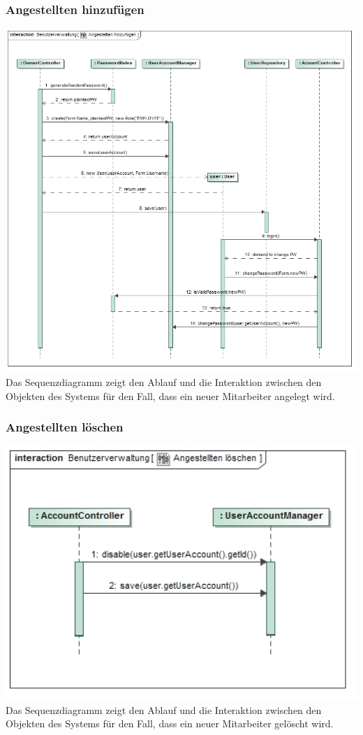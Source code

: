 \documentclass[pdftex,12pt,a4paper]{article}
\begin{document}
\subsubsection*{Angestellten hinzuf\"ugen}
\includegraphics[width=1\textwidth]{../../Entwurf/angestellten_hinzufuegen_ood}
Das Sequenzdiagramm zeigt den Ablauf und die Interaktion zwischen den Objekten des Systems f\"ur den Fall, dass ein neuer Mitarbeiter angelegt wird.
\subsubsection*{Angestellten l\"oschen}
\includegraphics[width=1\textwidth]{../../Entwurf/angestellten_loeschen_ood}
Das Sequenzdiagramm zeigt den Ablauf und die Interaktion zwischen den Objekten des Systems f\"ur den Fall, dass ein neuer Mitarbeiter gel\"oscht wird.
\end{document}
